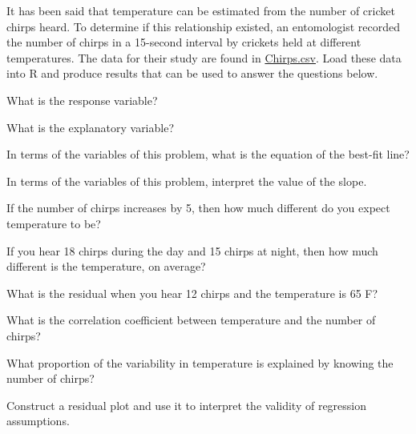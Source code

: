 \documentclass[10pt,openany]{book}\usepackage[]{graphicx}\usepackage[]{color}
\begin{document}
\begin{exsection}
  \item \label{revex:RegChirps} \rhw{} It has been said that temperature can be estimated from the number of cricket chirps heard.  To determine if this relationship existed, an entomologist recorded the number of chirps in a 15-second interval by crickets held at different temperatures.  The data for their study are found in \href{https://raw.githubusercontent.com/droglenc/NCData/master/Chirps.csv}{Chirps.csv}.  Load these data into R and produce results that can be used to answer the questions below. 
    \begin{Enumerate}
      \item What is the response variable?
      \item What is the explanatory variable?
      \item In terms of the variables of this problem, what is the equation of the best-fit line?
      \item In terms of the variables of this problem, interpret the value of the slope.
      \item If the number of chirps increases by 5, then how much different do you expect temperature to be?
      \item If you hear 18 chirps during the day and 15 chirps at night, then how much different is the temperature, on average?
      \item What is the residual when you hear 12 chirps and the temperature is 65 F?
      \item What is the correlation coefficient between temperature and the number of chirps?
      \item What proportion of the variability in temperature is explained by knowing the number of chirps?
      \item Construct a residual plot and use it to interpret the validity of regression assumptions.
    \end{Enumerate}

\end{exsection}
\end{document}

